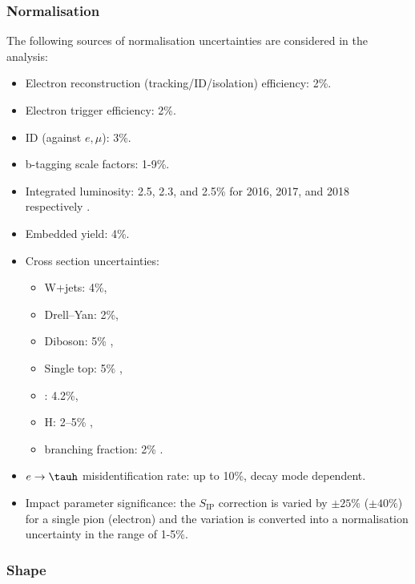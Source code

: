 \subsubsection{Normalisation}
The following sources of normalisation uncertainties are considered in the analysis:
\begin{itemize}
    \item Electron reconstruction (tracking/ID/isolation) efficiency: 2\%.
    \item Electron trigger efficiency: 2\%.
    \item \tauh ID (against $e,\mu$): 3\%.
    \item b-tagging scale factors: 1-9\%.
    \item Integrated luminosity: 2.5, 2.3, and 2.5\% for 2016, 2017, and 2018 respectively \cite{CMS:2017sdi, CMS:2018elu,CMS:2019jhq}.
    \item Embedded yield: 4\%.
    \item Cross section uncertainties:
    \begin{itemize}
        \item W+jets: 4\%,
        \item Drell–Yan: 2\%,
        \item Diboson: 5\% \cite{CMS:2016jdy},
        \item Single top: 5\% \cite{CMS:2016lel},
        \item \ttbar: 4.2\%,
        \item H: 2–5\% \cite{LHCHiggsCrossSectionWorkingGroup:2016ypw},
        \item \htt branching fraction: 2\% \cite{LHCHiggsCrossSectionWorkingGroup:2016ypw}.
    \end{itemize}
    \item $e\to\tauh$ misidentification rate: up to 10\%, decay mode dependent. 
    \item Impact parameter significance: the $S_\text{IP}$ correction is varied by $\pm25\%$ ($\pm40\%$) for a single pion (electron) and the variation is converted into a normalisation uncertainty in the range of 1-5\%.
\end{itemize}

\subsubsection{Shape}


